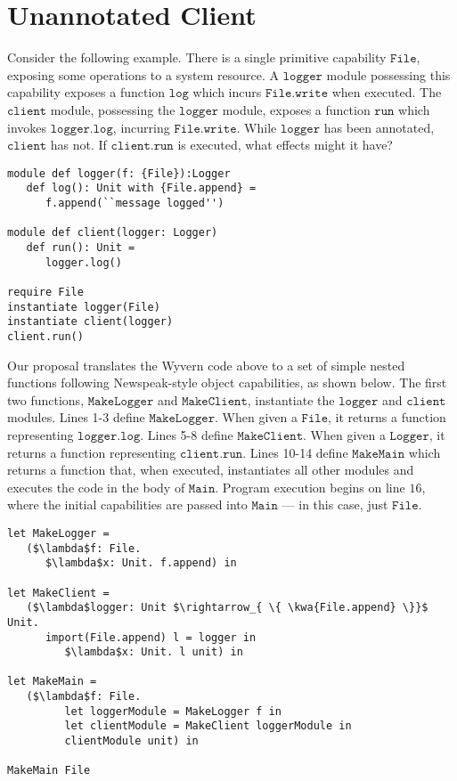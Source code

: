 \documentclass[sigplan,10pt]{acmart}\settopmatter{}
\newcommand{\kwa}[1]{\mathtt{#1}}
\begin{document}
\section{Unannotated Client}

Consider the following example. There is a single primitive capability $\kwa{File}$, exposing some operations to a system resource. A $\kwa{logger}$ module possessing this capability exposes a function $\kwa{log}$ which incurs $\kwa{File.write}$ when executed. The $\kwa{client}$ module, possessing the $\kwa{logger}$ module, exposes a function $\kwa{run}$ which invokes $\kwa{logger.log}$, incurring $\kwa{File.write}$. While $\kwa{logger}$ has been annotated, $\kwa{client}$ has not. If $\kwa{client.run}$ is executed, what effects might it have?


\begin{lstlisting}
module def logger(f: {File}):Logger
   def log(): Unit with {File.append} =
      f.append(``message logged'')

module def client(logger: Logger)
   def run(): Unit =
      logger.log()

require File
instantiate logger(File)
instantiate client(logger)
client.run()
\end{lstlisting}

Our proposal translates the Wyvern code above to a set of simple nested functions following Newspeak-style object capabilities, as shown below. The first two functions, $\kwa{MakeLogger}$ and $\kwa{MakeClient}$, instantiate the $\kwa{logger}$ and $\kwa{client}$ modules. Lines 1-3 define $\kwa{MakeLogger}$. When given a $\kwa{File}$, it returns a function representing $\kwa{logger.log}$. Lines 5-8 define $\kwa{MakeClient}$. When given a $\kwa{Logger}$, it returns a function representing $\kwa{client.run}$. Lines 10-14 define $\kwa{MakeMain}$ which returns a function that, when executed, instantiates all other modules and executes the code in the body of $\kwa{Main}$. Program execution begins on line $16$, where the initial capabilities are passed into $\kwa{Main}$ --- in this case, just $\kwa{File}$.

\begin{lstlisting}
let MakeLogger =
   ($\lambda$f: File.
      $\lambda$x: Unit. f.append) in
          
let MakeClient =
   ($\lambda$logger: Unit $\rightarrow_{ \{ \kwa{File.append} \}}$ Unit.
      import(File.append) l = logger in
         $\lambda$x: Unit. l unit) in
          
let MakeMain =
   ($\lambda$f: File.
         let loggerModule = MakeLogger f in
         let clientModule = MakeClient loggerModule in
         clientModule unit) in

MakeMain File
\end{lstlisting}
\end{document}
